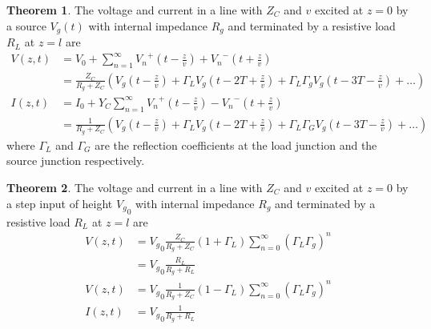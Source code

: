 \documentclass[titlepage, fleqn, a4paper, 12pt, twoside]{article}
\theoremstyle{definition}
\theoremstyle{theorem}
\newtheorem{theorem}{Theorem}
\begin{document}
\begin{theorem}
	The voltage and current in a line with $Z_C$ and $v$ excited at $z = 0$ by a source $V_g(t)$ with internal impedance $R_g$ and terminated by a resistive load $R_L$ at $z = l$ are
	\begin{align*}
		V(z,t) &= V_0 + \sum\limits_{n = 1}^{\infty} {V_n}^+\left( t - \frac{z}{v} \right) + {V_n}^-\left( t + \frac{z}{v} \right)\\
		&= \frac{Z_C}{R_g + Z_C} \left( V_g\left( t - \frac{z}{v} \right) + \Gamma_L V_g\left( t - 2 T + \frac{z}{v} \right) + \Gamma_L \Gamma_g V_g\left( t - 3 T - \frac{z}{v} \right) + \dots \right)\\
		I(z,t) &= I_0 + Y_C \sum\limits_{n = 1}^{\infty} {V_n}^+\left( t - \frac{z}{v} \right) - {V_n}^-\left( t + \frac{z}{v} \right)\\
		&= \frac{1}{R_g + Z_C} \left( V_g\left( t - \frac{z}{v} \right) + \Gamma_L V_g\left( t - 2 T + \frac{z}{v} \right) + \Gamma_L \Gamma_G V_g\left( t - 3 T - \frac{z}{v} \right) + \dots \right)
	\end{align*}
	where $\Gamma_L$ and $\Gamma_G$ are the reflection coefficients at the load junction and the source junction respectively.
\end{theorem}

\begin{theorem}
	The voltage and current in a line with $Z_C$ and $v$ excited at $z = 0$ by a step input of height ${V_g}_0$ with internal impedance $R_g$ and terminated by a resistive load $R_L$ at $z = l$ are
	\begin{align*}
		V(z,t) &= {V_g}_0 \frac{Z_C}{R_g + Z_C} (1 + \Gamma_L) \sum\limits_{n = 0}^{\infty} (\Gamma_L \Gamma_g)^n\\
		&= {V_g}_0 \frac{R_L}{R_g + R_L}\\
		V(z,t) &= {V_g}_0 \frac{1}{R_g + Z_C} (1 - \Gamma_L) \sum\limits_{n = 0}^{\infty} (\Gamma_L \Gamma_g)^n\\
		I(z,t) &= {V_g}_0 \frac{1}{R_g + R_L}
	\end{align*}
\end{theorem}
\end{document}
